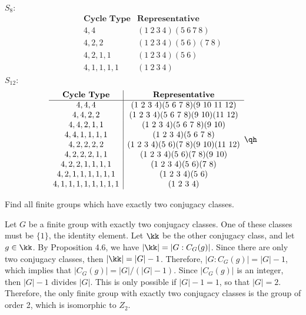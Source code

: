 \begin{sol}
	$S_8$:
	\[\begin{array}{c|c}
		\textbf{Cycle Type} & \textbf{Representative} \\
		\hline
		4, 4 & (1\ 2\ 3\ 4)(5\ 6\ 7\ 8) \\
		4, 2, 2 & (1\ 2\ 3\ 4)(5\ 6)(7\ 8) \\
		4, 2, 1, 1 & (1\ 2\ 3\ 4)(5\ 6) \\
		4, 1, 1, 1, 1 & (1\ 2\ 3\ 4)
	\end{array}\]
	$S_{12}$:
	\[\begin{array}{c|c}
		\textbf{Cycle Type} & \textbf{Representative} \\
		\hline
		4, 4, 4 & (1\ 2\ 3\ 4)(5\ 6\ 7\ 8)(9\ 10\ 11\ 12) \\
		4, 4, 2, 2 & (1\ 2\ 3\ 4)(5\ 6\ 7\ 8)(9\ 10)(11\ 12) \\
		4, 4, 2, 1, 1 & (1\ 2\ 3\ 4)(5\ 6\ 7\ 8)(9\ 10) \\
		4, 4, 1, 1, 1, 1 & (1\ 2\ 3\ 4)(5\ 6\ 7\ 8) \\
		4, 2, 2, 2, 2 & (1\ 2\ 3\ 4)(5\ 6)(7\ 8)(9\ 10)(11\ 12) \\
		4, 2, 2, 2, 1, 1 & (1\ 2\ 3\ 4)(5\ 6)(7\ 8)(9\ 10) \\
		4, 2, 2, 1, 1, 1, 1 & (1\ 2\ 3\ 4)(5\ 6)(7\ 8) \\
		4, 2, 1, 1, 1, 1, 1, 1 & (1\ 2\ 3\ 4)(5\ 6) \\
		4, 1, 1, 1, 1, 1, 1, 1, 1 & (1\ 2\ 3\ 4)
	\end{array} \qh\]
\end{sol}

\begin{specialexercise}
	Find all finite groups which have exactly two conjugacy classes.
\end{specialexercise}

\begin{sol}
	Let $G$ be a finite group with exactly two conjugacy classes. One of these classes must be $\{1\}$, the identity element. Let $\kk$ be the other conjugacy class, and let $g \in \kk$. By Proposition 4.6, we have $|\kk| = |G : C_G(g)|$. Since there are only two conjugacy classes, then $|\kk| = |G| - 1$. Therefore, $|G : C_G(g)| = |G| - 1$, which implies that $|C_G(g)| = |G|/(|G| - 1)$. Since $|C_G(g)|$ is an integer, then $|G| - 1$ divides $|G|$. This is only possible if $|G| - 1 = 1$, so that $|G| = 2$. Therefore, the only finite group with exactly two conjugacy classes is the group of order 2, which is isomorphic to $Z_2$.
\end{sol}

